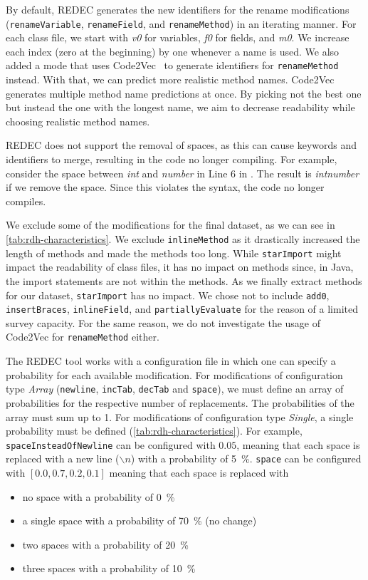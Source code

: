 \documentclass[%
class=scrreprt,
chapterprefix=false,%
open=right,%
twoside=true,%
paper=a4,%
logofile={Logo\_zentral\_farbig\_EN.png},%
thesistype=master,%
UKenglish,%
]{se2thesis}
\theoremstyle{definition}
\newcommand{\mod}{modification\xspace}
\newcommand{\mods}{modifications\xspace}
\newcommand{\rdh}{REDEC\xspace}
\begin{document}
	By default, \rdh generates the new identifiers for the rename modifications (\texttt{renameVariable}, \texttt{renameField}, and \texttt{renameMethod}) in an iterating manner. For each class file, we start with \textit{v0} for variables, \textit{f0} for fields, and \textit{m0}. We increase each index (zero at the beginning) by one whenever a name is used.
	We also added a mode that uses Code2Vec~\cite{alon2019code2vec} to generate identifiers for \texttt{renameMethod} instead. With that, we can predict more realistic method names. Code2Vec generates multiple method name predictions at once. By picking not the best one but instead the one with the longest name, we aim to decrease readability while choosing realistic method names.
		
	\rdh does not support the removal of spaces, as this can cause keywords and identifiers to merge, resulting in the code no longer compiling.
    For example, consider the space between \textit{int} and \textit{number} in Line 6 in . The result is \textit{intnumber} if we remove the space. Since this violates the syntax, the code no longer compiles.
	
	We exclude some of the modifications for the final dataset, as we can see in \autoref{tab:rdh-characteristics}.
    We exclude \texttt{inlineMethod} as it drastically increased the length of methods and made the methods too long.
    While \texttt{starImport} might impact the readability of class files, it has no impact on methods since, in Java, the import statements are not within the methods. As we finally extract methods for our dataset, \texttt{starImport} has no impact.
    We chose not to include \texttt{add0}, \texttt{insertBraces}, \texttt{inlineField}, and \texttt{partiallyEvaluate} for the reason of a limited survey capacity.
    For the same reason, we do not investigate the usage of Code2Vec for \texttt{renameMethod} either.
	
	The \rdh tool works with a configuration file in which one can specify a probability for each available \mod.
    For \mods of configuration type \textit{Array} (\texttt{newline}, \texttt{incTab}, \texttt{decTab} and \texttt{space}), we must define an array of probabilities for the respective number of replacements. The probabilities of the array must sum up to 1.
    For \mods of configuration type \textit{Single}, a single probability must be defined (\autoref{tab:rdh-characteristics}).
    For example, \texttt{spaceInsteadOfNewline} can be configured with $0.05$, meaning that each space is replaced with a new line ($\backslash n$) with a probability of 5~\%.
    \texttt{space} can be configured with $[0.0, 0.7, 0.2, 0.1]$ meaning that each space is replaced with
	\begin{itemize}
		\item no space with a probability of 0~\%
		\item a single space with a probability of 70~\% (no change)
		\item two spaces with a probability of 20~\%
		\item three spaces with a probability of 10~\% 
	\end{itemize}
		
\end{document}
